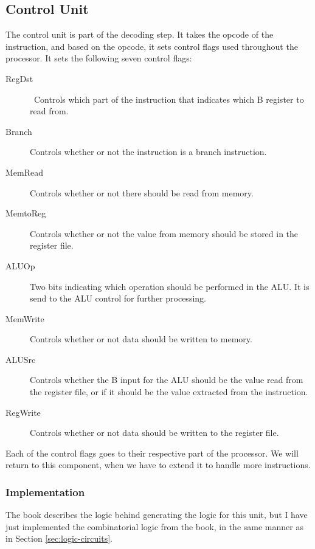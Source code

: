 \subsection{Control Unit}
\label{sec:control-unit}
The control unit is part of the decoding step. It takes the opcode of the
instruction, and based on the opcode, it sets control flags used throughout the
processor. It sets the following seven control flags:
\begin{description}
    \item[RegDst] Controls which part of the instruction that indicates which
        B register to read from.

    \item[Branch] Controls whether or not the instruction is a branch
        instruction.

    \item[MemRead] Controls whether or not there should be read from memory.

    \item[MemtoReg] Controls whether or not the value from memory should be
        stored in the register file.

    \item[ALUOp] Two bits indicating which operation should be performed in
        the ALU. It is send to the ALU control for further processing.

    \item[MemWrite] Controls whether or not data should be written to memory.

    \item[ALUSrc] Controls whether the B input for the ALU should be the
        value read from the register file, or if it should be the value
        extracted from the instruction.

    \item[RegWrite] Controls whether or not data should be written to the
        register file.
\end{description}
Each of the control flags goes to their respective part of the processor.
We will return to this component, when we have to extend it to handle more
instructions.

\subsubsection*{Implementation}
The book describes the logic behind generating the logic for this unit, but I
have just implemented the combinatorial logic from the book, in the same manner
as in Section \ref{sec:logic-circuits}.

